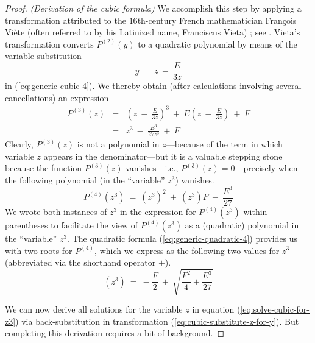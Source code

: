 \begin{proof} {\it (Derivation of the cubic formula)}
\noindent
We accomplish this step by applying a transformation attributed to the
$16$th-century French mathematician Fran\c{c}ois Vi\`{e}te
 (often referred to by his Latinized
name, Franciscus Vieta) ; see
\cite{Hazewinkel}.  Vieta's transformation converts $P^{(2)}(y)$ to a
quadratic polynomial by means of the variable-substitution
\begin{equation}
\label{eq:cubic-substitute-z-for-y}
y \ = \ z \ - \ \frac{E}{3z}
\end{equation}
in (\ref{eq:generic-cubic-4}).  We thereby obtain (after calculations
involving several cancellations) an expression
\begin{eqnarray}
\nonumber
P^{(3)}(z) & = & \left( z \ - \ \frac{E}{3z} \right)^3
\ + \ E \left(z \ - \ \frac{E}{3z} \right) \ + \ F \\
\label{eq:generic-cubic-5}
  & = &
z^3 \ - \ \frac{E^3}{27z^3}  \ + \ F
\end{eqnarray}
Clearly, $P^{(3)}(z)$ is not a polynomial in $z$---because of the term
in which variable $z$ appears in the denominator---but it is a
valuable stepping stone because the function $P^{(3)}(z)$
vanishes---i.e., $P^{(3)}(z) = 0$---precisely when the following
polynomial (in the ``variable'' $z^3$) vanishes.
\[ P^{(4)}(z^3) \ = \ (z^3)^2 \ + \ (z^3) F \ - \ \frac{E^3}{27} \]
We wrote both instances of $z^3$ in the expression for $P^{(4)}(z^3)$
within parentheses to facilitate the view of $P^{(4)}(z^3)$ as a
(quadratic) polynomial in the ``variable'' $z^3$.  The quadratic
formula (\ref{eq:generic-quadratic-4}) provides us with two roots for
$P^{(4)}$, which we express as the following two values for $z^3$
(abbreviated via the shorthand operator $\pm$).
\begin{equation}
\label{eq:solve-cubic-for-z3}
(z^3) \ = \
- \frac{F}{2} \ \pm \ \sqrt{\frac{F^2}{4} + \frac{E^3}{27}}
\end{equation}

We can now derive all solutions for the variable $z$ in equation
(\ref{eq:solve-cubic-for-z3}) via back-substitution in transformation
(\ref{eq:cubic-substitute-z-for-y}).  But completing this derivation
requires a bit of background.


\end{proof}
